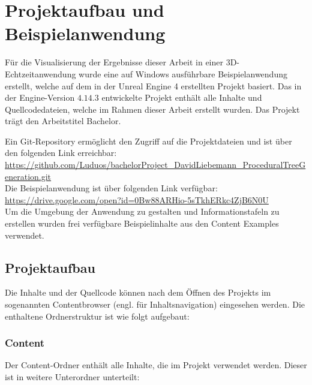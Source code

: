 \chapter{Projektaufbau und Beispielanwendung} \label{ch:Projektaufbau}

Für die Visualisierung der Ergebnisse dieser Arbeit in einer 3D-Echtzeitanwendung wurde eine auf Windows ausführbare Beispielanwendung erstellt, welche auf dem in der Unreal Engine 4 erstellten Projekt basiert. \cite{UnrealTerminology:17} Das in der Engine-Version $4.14.3$ entwickelte Projekt enthält alle Inhalte und Quellcodedateien, welche im Rahmen dieser Arbeit erstellt wurden. Das Projekt trägt den Arbeitstitel \glqq Bachelor\grqq. 

Ein Git-Repository ermöglicht den Zugriff auf die Projektdateien und ist über den folgenden Link erreichbar: \\

\url{https://github.com/Luduos/bachelorProject_DavidLiebemann_ProceduralTreeGeneration.git} \\

Die Beispielanwendung ist über folgenden Link verfügbar: \\

\url{https://drive.google.com/open?id=0Bw88ARHio-5sTkhERkc4ZjB6N0U} \\

Um die Umgebung der Anwendung zu gestalten und Informationstafeln zu erstellen wurden frei verfügbare Beispielinhalte aus den Content Examples verwendet. \cite{UnrealContentExamples:17}

\section{Projektaufbau}

Die Inhalte und der Quellcode können nach dem Öffnen des Projekts im sogenannten Contentbrowser (engl. für Inhaltsnavigation) eingesehen werden. Die enthaltene Ordnerstruktur ist wie folgt aufgebaut:

\subsection{Content}

Der Content-Ordner enthält alle Inhalte, die im Projekt verwendet werden. Dieser ist in weitere Unterordner unterteilt:

